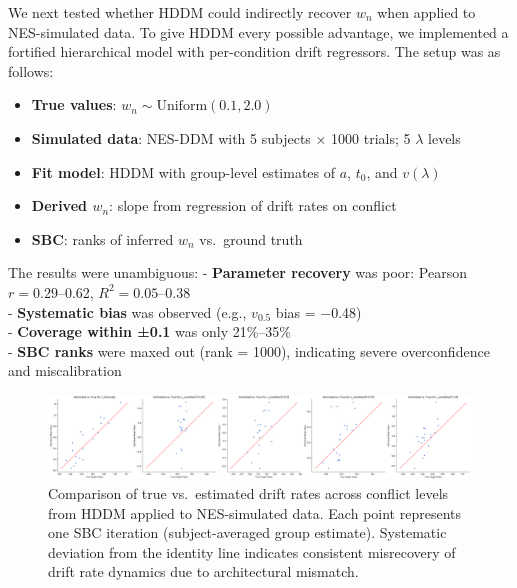\documentclass[
  11pt,
]{article}
\providecommand{\tightlist}{%
  \setlength{\itemsep}{0pt}\setlength{\parskip}{0pt}}
\begin{document}
We next tested whether HDDM could indirectly recover \(w_n\) when
applied to NES-simulated data. To give HDDM every possible advantage, we
implemented a fortified hierarchical model with per-condition drift
regressors. The setup was as follows:

\begin{itemize}
\tightlist
\item
  \textbf{True values}: \(w_n \sim \mathrm{Uniform}(0.1, 2.0)\)\\
\item
  \textbf{Simulated data}: NES-DDM with 5 subjects × 1000 trials; 5
  \(\lambda\) levels\\
\item
  \textbf{Fit model}: HDDM with group-level estimates of \(a\), \(t_0\),
  and \(v(\lambda)\)\\
\item
  \textbf{Derived \(w_n\)}: slope from regression of drift rates on
  conflict\\
\item
  \textbf{SBC}: ranks of inferred \(w_n\) vs.~ground truth
\end{itemize}

The results were unambiguous: - \textbf{Parameter recovery} was poor:
Pearson \(r = 0.29\)--0.62, \(R^2 = 0.05\)--0.38\\
- \textbf{Systematic bias} was observed (e.g., \(v_{0.5}\) bias =
−0.48)\\
- \textbf{Coverage within ±0.1} was only 21\%--35\%\\
- \textbf{SBC ranks} were maxed out (rank = 1000), indicating severe
overconfidence and miscalibration

\begin{figure}
\centering
\includegraphics[width=0.9\linewidth,height=\textheight,keepaspectratio]{figures/fortified_hddm_chart.png}
\caption{Comparison of true vs.~estimated drift rates across conflict
levels from HDDM applied to NES-simulated data. Each point represents
one SBC iteration (subject-averaged group estimate). Systematic
deviation from the identity line indicates consistent misrecovery of
drift rate dynamics due to architectural
mismatch.}\label{fig:fortified_chart}
\end{figure}
\end{document}
